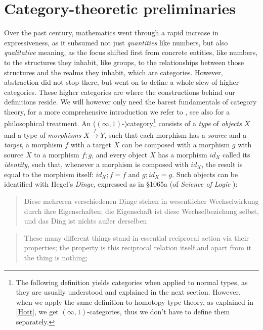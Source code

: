 \documentclass{article}
\begin{document}
\section{Category-theoretic preliminaries}
Over the past century, mathematics went through a rapid increase in expressiveness, as it subsumed not just \emph{quantities} like numbers, but also \emph{qualitative} meaning, as the focus shifted first from concrete entities, like numbers, to the structures they inhabit, like groups, to the relationships between those structures and the realms they inhabit, which are categories. However, abstraction did not stop there, but went on to define a whole slew of higher categories. These higher categories are where the constructions behind our definitions reside. We will however only need the barest fundamentals of category theory, for a more comprehensive introduction we refer to \cite{Lein}, see also \cite{CPhil} for a philosophical treatment. An ($(\infty, 1)$-)category\footnote{The following definition yields categories when applied to normal types, as they are usually understood and explained in the next section. However, when we apply the same definition to homotopy type theory, as explained in \ref{Hott}, we get $(\infty,1)$-categories, thus we don't have to define them separately.} consists of a \emph{type} of \emph{objects} $X$ and a type of \emph{morphisms} $X\xrightarrow{f} Y$, such that each morphism has a \emph{source} and a \emph{target}, a morphism $f$ with a target $X$ can be composed with a morphism $g$ with source $X$ to a morphism $f;g$, and every object $X$ has a morphism $id_X$ called its \emph{identity}, such that, whenever a morphism is composed with $id_X$, the result is equal to the morphism itself: $id_X;f=f$ and $g;id_X=g$. Such objects can be identified with Hegel's \emph{Dinge}, expressed as in §1065a (of \emph{Science of Logic} \cite{Sol}):

\begin{quote}
    Diese mehreren verschiedenen Dinge stehen in wesentlicher Wechselwirkung durch ihre Eigenschaften; die Eigenschaft ist diese Wechselbeziehung selbst, und das Ding ist nichts außer derselben
\end{quote}

\begin{quote}
    These many different things stand in essential reciprocal action via their properties; the property is this reciprocal relation itself and apart from it the thing is nothing;
\end{quote}
\end{document}
